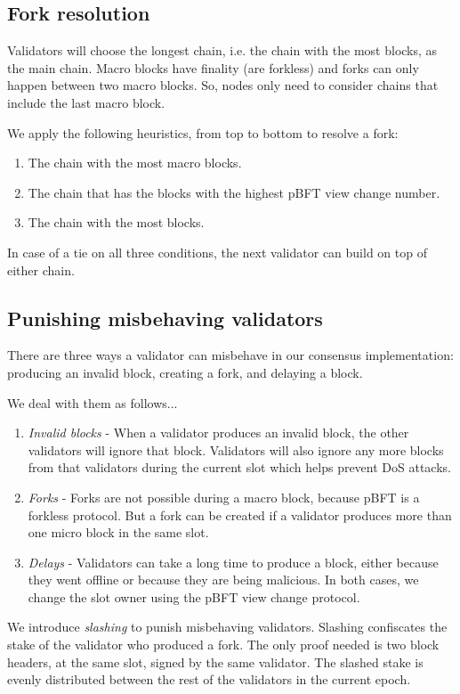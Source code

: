 \documentclass[8pt,fleqn,openany]{book}
\begin{document}
\subsection{Fork resolution}
Validators will choose the longest chain, i.e. the chain with the most blocks, as the main chain. Macro blocks have finality (are forkless) and forks can only happen between two macro blocks. So, nodes only need to consider chains that include the last macro block.

We apply the following heuristics, from top to bottom to resolve a fork:

\begin{enumerate}
	\item The chain with the most macro blocks.
	\item The chain that has the blocks with the highest pBFT view change number.
	\item The chain with the most blocks.
\end{enumerate}

In case of a tie on all three conditions, the next validator can build on top of either chain.

\subsection{Punishing misbehaving validators}
There are three ways a validator can misbehave in our consensus implementation: producing an invalid block, creating a fork, and delaying a block.

We deal with them as follows...

\begin{enumerate}
	\item {\em Invalid blocks} - When a validator produces an invalid block, the other validators will ignore that block. Validators will also ignore any more blocks from that validators during the current slot which helps prevent DoS attacks.
	\item {\em Forks} - Forks are not possible during a macro block, because pBFT is a forkless protocol. But a fork can be created if a validator produces more than one micro block in the same slot. 
	\item {\em Delays} - Validators can take a long time to produce a block, either because they went offline or because they are being malicious. In both cases, we change the slot owner using the pBFT view change protocol. 
\end{enumerate}

We introduce \textit{slashing} to punish misbehaving validators. Slashing confiscates the stake of the validator who produced a fork. The only proof needed is two block headers, at the same slot, signed by the same validator. The slashed stake is evenly distributed between the rest of the validators in the current epoch.
\end{document}
